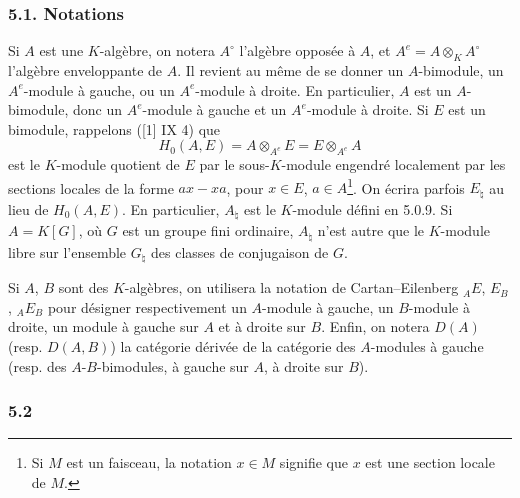 \documentclass[11pt]{article}
\begin{document}
\subsubsection*{5.1. Notations}

Si $A$ est une $K$-algèbre, on notera $A^\circ$ l'algèbre opposée à $A$, et $A^e=A\otimes_KA^\circ$ l'algèbre enveloppante de $A$. Il revient au même de se donner un $A$-bimodule, un $A^e$-module à gauche, ou un $A^e$-module à droite. En particulier, $A$ est un $A$-bimodule, donc un $A^e$-module à gauche et un $A^e$-module à droite. Si $E$ est un bimodule, rappelons ([1] IX 4) que
\[
H_0(A,E)=A\otimes_{A^e}E=E\otimes_{A^e}A
\]
est le $K$-module quotient de $E$ par le sous-$K$-module engendré localement par les sections locales de la forme $ax-xa$, pour $x\in E$, $a\in A$\footnote{Si $M$ est un faisceau, la notation $x\in M$ signifie que $x$ est une section locale de $M$.}. On écrira parfois $E_\natural$ au lieu de $H_0(A,E)$. En particulier, $A_\natural$ est le $K$-module défini en 5.0.9. Si $A=K[G]$, où $G$ est un groupe fini ordinaire, $A_\natural$ n'est autre que le $K$-module libre sur l'ensemble $G_\natural$ des classes de conjugaison de $G$.

Si $A$, $B$ sont des $K$-algèbres, on utilisera la notation de Cartan--Eilenberg ${}_AE$, $E_B$, ${}_AE_B$ pour désigner respectivement un $A$-module à gauche, un $B$-module à droite, un module à gauche sur $A$ et à droite sur $B$. Enfin, on notera $D(A)$ (resp. $D(A,B)$) la catégorie dérivée de la catégorie des $A$-modules à gauche (resp. des $A$-$B$-bimodules, à gauche sur $A$, à droite sur $B$).

\subsubsection*{5.2}
\end{document}
